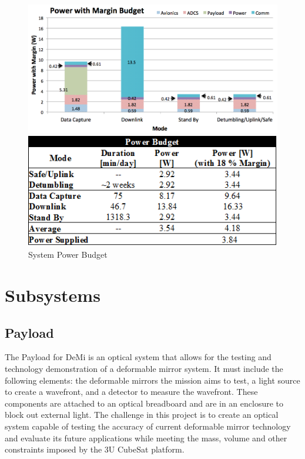 \documentclass[12pt]{article}
\begin{document}
			\begin{figure}[!ht]
				\centering
				\includegraphics[width=5in]{images/MissionOverview_4.png}

				\includegraphics[width=5in]{images/MissionOverview_6.png}
				\caption{System Power Budget}
				\label{fig:Mission_power2}
			\end{figure}
\newpage			
\section{Subsystems}

\FloatBarrier

		\subsection{Payload}
The Payload for DeMi is an optical system that allows for the testing
and technology demonstration of a deformable mirror system.  It must include the following  elements: the deformable mirrors the
mission aims to test, a light source to create a wavefront, and a detector to measure the wavefront.  These components are attached
to an optical breadboard and are in an enclosure to block out external
light.  The challenge in this project is to create an optical system capable of testing the accuracy of current deformable mirror technology and evaluate its future applications while meeting the mass, volume and other constraints imposed by the 3U CubeSat platform.
			
\end{document}
